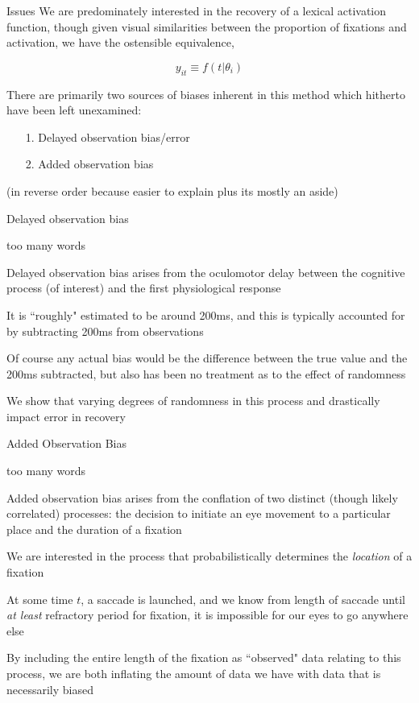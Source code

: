 \documentclass{beamer}
\newcommand{\vp}{\vspace{2mm}}
\begin{document}
\begin{frame}{Issues}
We are predominately interested in the recovery of a lexical activation function, though given visual similarities between the proportion of fixations and activation, we have the ostensible equivalence, 

\begin{equation}
y_{it} \equiv f(t | \theta_i)
\end{equation}

There are primarily two sources of biases inherent in this method which hitherto have been left unexamined:

\begin{itemize}
\item[1.] Delayed observation bias/error
\item[2.] Added observation bias
\end{itemize}

(in reverse order because easier to explain plus its mostly an aside)
\end{frame}


\begin{frame}{Delayed observation bias}

too many words \vp

Delayed observation bias arises from the oculomotor delay between the cognitive process (of interest) and the first physiological response \vp

It is ``roughly" estimated to be around 200ms, and this is typically accounted for by subtracting 200ms from observations \vp

Of course any actual bias would be the difference between the true value and the 200ms subtracted, but also has been no treatment as to the effect of randomness \vp

We show that varying degrees of randomness in this process and drastically impact error in recovery
\end{frame}

\begin{frame}{Added Observation Bias}

too many words \vp

Added observation bias arises from the conflation of two distinct (though likely correlated) processes: the decision to initiate an eye movement to a particular place and the duration of a fixation\vp

We are interested in the process that probabilistically determines the \textit{location} of a fixation \vp

At some time $t$, a saccade is launched, and we know from length of saccade until \textit{at least} refractory period for fixation, it is impossible for our eyes to go anywhere else \vp

By including the entire length of the fixation as ``observed" data relating to this process, we are both inflating the amount of data we have with data that is necessarily biased
\end{frame}
\end{document}
